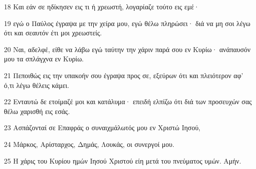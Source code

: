 \par 18 Και εάν σε ηδίκησεν εις τι ή χρεωστή, λογαρίαζε τούτο εις εμέ·
\par 19 εγώ ο Παύλος έγραψα με την χείρα μου, εγώ θέλω πληρώσει· διά να μη σοι λέγω ότι και σεαυτόν έτι μοι χρεωστείς.
\par 20 Ναι, αδελφέ, είθε να λάβω εγώ ταύτην την χάριν παρά σου εν Κυρίω· ανάπαυσόν μου τα σπλάγχνα εν Κυρίω.
\par 21 Πεποιθώς εις την υπακοήν σου έγραψα προς σε, εξεύρων ότι και πλειότερον αφ' ό,τι λέγω θέλεις κάμει.
\par 22 Ενταυτώ δε ετοίμαζέ μοι και κατάλυμα· επειδή ελπίζω ότι διά των προσευχών σας θέλω χαρισθή εις εσάς.
\par 23 Ασπάζονταί σε Επαφράς ο συναιχμάλωτός μου εν Χριστώ Ιησού,
\par 24 Μάρκος, Αρίσταρχος, Δημάς, Λουκάς, οι συνεργοί μου.
\par 25 Η χάρις του Κυρίου ημών Ιησού Χριστού είη μετά του πνεύματος υμών. Αμήν.


